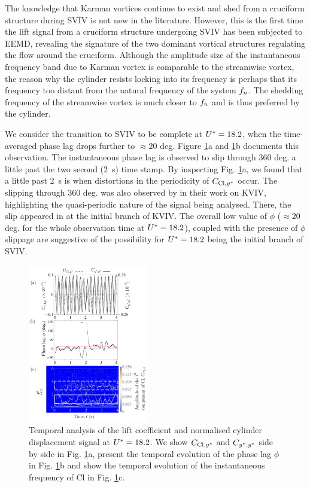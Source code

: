 \documentclass[oneside]{utmthesis}
\begin{document}
The knowledge that Karman vortices continue to exist and shed from a cruciform structure during SVIV is not new in the literature. However, this is the first time the lift signal from a cruciform structure undergoing SVIV has been subjected to EEMD, revealing the signature of the two dominant vortical structures regulating the flow around the cruciform. Although the amplitude size of the instantaneous frequency band due to Karman vortex is comparable to the streamwise vortex, the reason why the cylinder resists locking into its frequency is perhaps that its frequency too distant from the natural frequency of the system $f_{n}$. The shedding frequency of the streamwise vortex is much closer to $f_{n}$ and is thus preferred by the cylinder.

We consider the transition to SVIV to be complete at $U^{*} = 18.2$, when the time-averaged phase lag drops further to $\approx 20$ deg. Figure \ref{fig:tempAnalysisStableInitialBranch}a and \ref{fig:tempAnalysisStableInitialBranch}b documents this observation. The instantaneous phase lag is observed to slip through 360 deg. a little past the two second (\SI{2}{\second}) time stamp. By inspecting Fig. \ref{fig:tempAnalysisStableInitialBranch}a, we found that a little past \SI{2}{\second} is when distortions in the periodicity of $C_{\text{Cl},y^{*}}$ occur. The slipping through 360 deg. was also observed by \citet{Khalak1999} in their work on KVIV, highlighting the quasi-periodic nature of the signal being analysed. There, the slip appeared in \citet{Khalak1999} at the initial branch of KVIV. The overall low value of $\phi$ ($\approx 20$ deg. for the whole observation time at $U^{*} = 18.2$), coupled with the presence of $\phi$ slippage are suggestive of the possibility for $U^{*} = 18.2$ being the initial branch of SVIV.

\begin{figure}
  \centering
  \includegraphics[width=0.47\textwidth]{figs/tempAnalysisStableInitialBranch}
  \caption{Temporal analysis of the lift coefficient and normalised cylinder displacement signal at $U^{*} = 18.2$. We show $C_{\text{Cl},y^{*}}$ and $C_{y^{*},y^{*}}$ side by side in Fig. \ref{fig:tempAnalysisStableInitialBranch}a, present the temporal evolution of the phase lag $\phi$ in Fig. \ref{fig:tempAnalysisStableInitialBranch}b and show the temporal evolution of the instantaneous frequency of Cl in Fig. \ref{fig:tempAnalysisStableInitialBranch}c.}
  \label{fig:tempAnalysisStableInitialBranch}
\end{figure}
\end{document}
